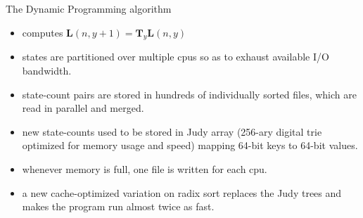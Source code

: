 \documentclass{prosper}
\newcommand{\BFL}{\mathbf{L}}
\newcommand{\BFv}{\mathbf{v}}
\newcommand{\BFT}{\mathbf{T}}
\begin{document}
\begin{slide}{The Dynamic Programming algorithm}
\begin{itemize}
%
%
\item computes $\BFL(n,y+1) = \BFT_{y} \BFL(n,y)$ \\
\item states are partitioned over multiple cpus so as to exhaust
available I/O bandwidth.
\item state-count pairs are stored in hundreds of individually
sorted files, which are read in parallel and merged.
\item new state-counts used to be stored in Judy array
(256-ary digital trie optimized for memory usage and speed)
mapping 64-bit keys to 64-bit values.
\item whenever memory is full, one file is written for each cpu.
\item a new cache-optimized variation on radix sort replaces the Judy trees
and makes the program run almost twice as fast.
\end{itemize}
\end{slide}
\end{document}
